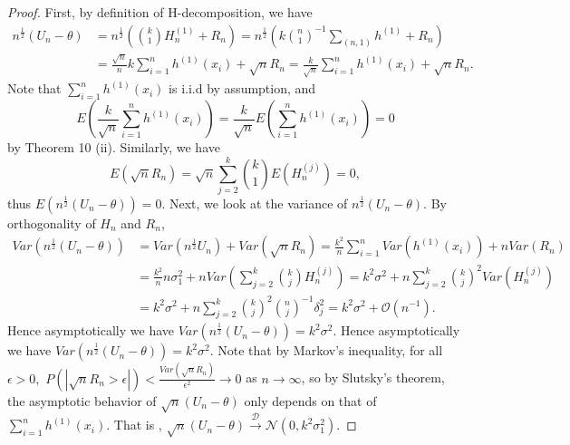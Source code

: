\documentclass{article}
\theoremstyle{definition}
\numberwithin{Def}{section}
\begin{document}
    \begin{proof}
      First, by definition of H-decomposition, we have 
      \begin{align*}
          n^{\frac{1}{2}}(U_n - \theta) &= n^{\frac{1}{2}} \left( {k \choose 1} H_n^{(1)} + R_n \right) 
          = n^{\frac{1}{2}} \left( k {n \choose 1}^{-1} \sum_{ (n,1) } h^{(1)} + R_n \right) \\
          &= \frac{\sqrt{n}}{n} k \sum_{i = 1}^{n} h^{(1)}(x_i) + \sqrt{n}R_n 
          = \frac{k}{\sqrt{n}} \sum_{i = 1}^{n} h^{(1)}(x_i) + \sqrt{n}R_n. 
      \end{align*}
      Note that $\sum_{i = 1}^{n} h^{(1)}(x_i)$ is i.i.d by assumption, and $$ E (\frac{k}{\sqrt{n}} \sum_{i = 1}^{n} h^{(1)}(x_i)) = \frac{k}{\sqrt{n}} E( \sum_{i = 1}^{n}h^{(1)} (x_i) ) = 0$$
      by Theorem 10 (ii). Similarly, we have $$E(\sqrt{n}R_n) = \sqrt{n} \sum_{j = 2}^k {k \choose 1} E(H_n^{(j)}) = 0,$$
      thus $E\left( n^{\frac{1}{2}}(U_n - \theta) \right) = 0. $ 
      Next, we look at the variance of $n^{\frac{1}{2}}(U_n - \theta)$. By orthogonality of $H_n$ and $R_n$,
      \begin{align*}
          Var(n^{\frac{1}{2}}(U_n - \theta) ) &= Var(n^{\frac{1}{2}} U_n) + Var(\sqrt{n}R_n) 
          = \frac{k^2}{n} \sum_{i = 1}^n Var(h^{(1)} (x_i) )  + n Var(R_n) \\
          &= \frac{k^2}{n} n \sigma_1^2 + n Var( \sum_{j = 2}^k {k \choose j} H_n^{(j)}) 
          = k^2 \sigma^2 + n \sum_{j = 2}^k {k \choose j}^2 Var(H_n^{(j)}) \\
          &= k^2 \sigma^2 + n \sum_{j = 2}^k {k \choose j}^2 {n \choose j}^{-1} \delta_j^2 
          = k^2 \sigma^2 + \mathcal{O}(n^{-1}).
      \end{align*}
      Hence asymptotically we have $Var(n^{\frac{1}{2}}(U_n - \theta) ) = k^2 \sigma^2$. 
      Hence asymptotically we have $Var(n^{\frac{1}{2}}(U_n - \theta) ) = k^2 \sigma^2$.
      Note that by Markov's inequality, for all $\epsilon > 0,$ $P(|\sqrt{n}R_n > \epsilon| ) < \frac{Var(\sqrt{n} R_n)}{\epsilon^2} \rightarrow 0$ as $n \rightarrow \infty$, so by Slutsky's theorem, the asymptotic behavior of $\sqrt{n}(U_n - \theta)$ only depends on that of $ \sum_{i = 1}^{n}h^{(1)} (x_i)$. That is , $ \sqrt{n}(U_n - \theta) \xrightarrow{\mathcal{D}} \mathcal{N}(0, k^2 \sigma_1^2 ).$
    \end{proof}
    
\end{document}
